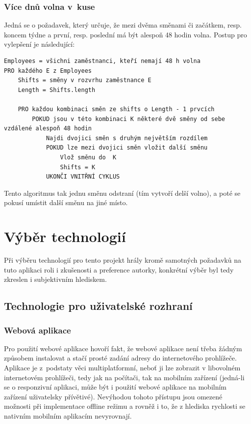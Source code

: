 \documentclass[twoside]{ctuthesis}
\begin{document}
\begin{enumerate}[label=\textbf{O\arabic*.}]
\subsection{Více dnů volna v~kuse}
Jedná se o požadavek, který určuje, že mezi dvěma směnami či začátkem, resp. koncem týdne a první, resp. poslední má být alespoň 48 hodin volna. Postup pro vylepšení je následující:

\begin{lstlisting}[caption={Pseudokód pro vylepšování obsazení specializovaných směn}]
Employees = všichni zaměstnanci, kteří nemají 48 h volna
PRO každého E z Employees
	Shifts = směny v rozvrhu zaměstnance E
	Length = Shifts.length

	PRO každou kombinaci směn ze shifts o Length - 1 prvcích
		POKUD jsou v této kombinaci K některé dvě směny od sebe vzdálené alespoň 48 hodin
			Najdi dvojici směn s druhým největším rozdílem
			POKUD lze mezi dvojici směn vložit další směnu
				Vlož směnu do  K
				Shifts = K
			UKONČI VNITŘNÍ CYKLUS
\end{lstlisting}

Tento algoritmus tak jednu směnu odstraní (tím vytvoří delší volno), a poté se pokusí umístit další směnu na jiné místo.



\chapter{Výběr technologií}
Při výběru technologií pro tento projekt hrály kromě samotných požadavků na tuto aplikaci roli i zkušenosti a preference autorky, konkrétní výběr byl tedy zkreslen i subjektivním hlediskem.

\section{Technologie pro uživatelské rozhraní}

\subsection{Webová aplikace}
Pro použití webové aplikace hovoří fakt, že webové aplikace není třeba žádným způsobem instalovat a stačí prosté zadání adresy do internetového prohlížeče. Aplikace je z~podstaty věci multiplatformní, neboť ji lze zobrazit v libovolném internetovém prohlížeči, tedy jak na počítači, tak na mobilním zařízení (jedná-li se o responzivní aplikaci, může být i použití webové aplikace na mobilním zařízení uživatelsky přívětivé). Nevýhodou tohoto přístupu jsou omezené možnosti při implementace offline režimu a rovněž i to, že z hlediska rychlosti se nativním mobilním aplikacím nevyrovnají.



\end{enumerate}
\end{document}
